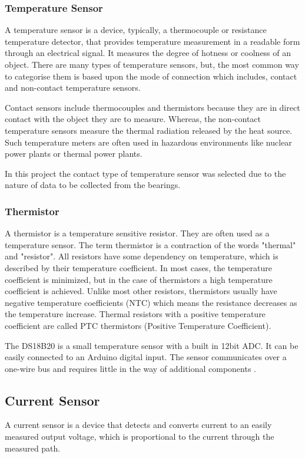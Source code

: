 \subsubsection{Temperature Sensor}
A temperature sensor is a device, typically, a thermocouple or resistance temperature detector, that provides temperature measurement in a readable form through an electrical signal. It measures the degree of hotness or coolness of an object. There are many types of temperature sensors, but, the most common way to categorise them is based upon the mode of connection which includes, contact and non-contact temperature sensors\cite{noauthor_temperature_2019}. 

Contact sensors include thermocouples and thermistors because they are in direct contact with the object they are to measure. Whereas, the non-contact temperature sensors measure the thermal radiation released by the heat source. Such temperature meters are often used in hazardous environments like nuclear power plants or thermal power plants. 

In this project the contact type of temperature sensor was selected due to the nature of data to be collected from the bearings. 
\subsubsection{Thermistor}
A thermistor is a temperature sensitive resistor. They are often used as a temperature sensor. The term thermistor is a contraction of the words "thermal" and "resistor". All resistors have some dependency on temperature, which is described by their temperature coefficient. In most cases, the temperature coefficient is minimized, but in the case of thermistors a high temperature coefficient is achieved. Unlike most other resistors, thermistors usually have negative temperature coefficients (NTC) which means the resistance decreases as the temperature increase. Thermal resistors with a positive temperature coefficient are called PTC thermistors (Positive Temperature Coefficient)\cite{noauthor_learn_nodate}.

The DS18B20 is a small temperature sensor with a built in 12bit ADC. It can be easily connected to an Arduino digital input. The sensor communicates over a one-wire bus and requires little in the way of additional components \cite{noauthor_learn_nodate}.

\subsection{Current Sensor}
A current sensor is a device that detects and converts current to an easily measured output voltage, which is proportional to the current through the measured path.


